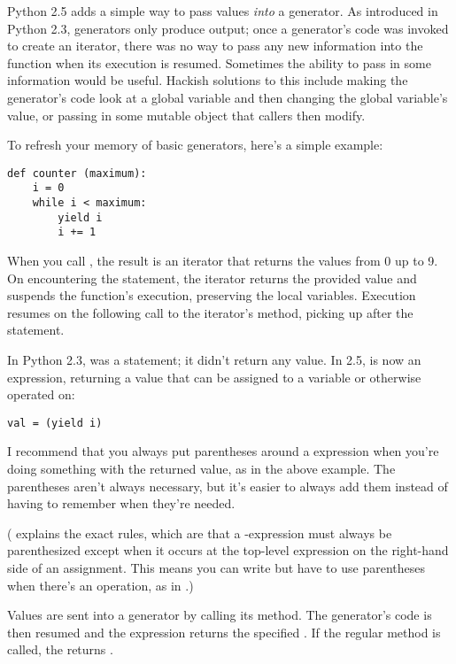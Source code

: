 \documentclass{howto}
\begin{document}
Python 2.5 adds a simple way to pass values \emph{into} a generator.
As introduced in Python 2.3, generators only produce output; once a
generator's code was invoked to create an iterator, there was no way to
pass any new information into the function when its execution is
resumed.  Sometimes the ability to pass in some information would be
useful.  Hackish solutions to this include making the generator's code
look at a global variable and then changing the global variable's
value, or passing in some mutable object that callers then modify.

To refresh your memory of basic generators, here's a simple example:

\begin{verbatim}
def counter (maximum):
    i = 0
    while i < maximum:
        yield i
        i += 1
\end{verbatim}

When you call , the result is an iterator that
returns the values from 0 up to 9.  On encountering the
 statement, the iterator returns the provided value and
suspends the function's execution, preserving the local variables.
Execution resumes on the following call to the iterator's 
 method, picking up after the  statement.

In Python 2.3,  was a statement; it didn't return any
value.  In 2.5,  is now an expression, returning a
value that can be assigned to a variable or otherwise operated on:

\begin{verbatim}
val = (yield i)
\end{verbatim}

I recommend that you always put parentheses around a 
expression when you're doing something with the returned value, as in
the above example.  The parentheses aren't always necessary, but it's
easier to always add them instead of having to remember when they're
needed.

( explains the exact rules, which are that a
-expression must always be parenthesized except when it
occurs at the top-level expression on the right-hand side of an
assignment.  This means you can write  but have to
use parentheses when there's an operation, as in .)

Values are sent into a generator by calling its
 method.  The generator's code is then
resumed and the  expression returns the specified
.  If the regular  method is called, the
 returns .
\end{document}
